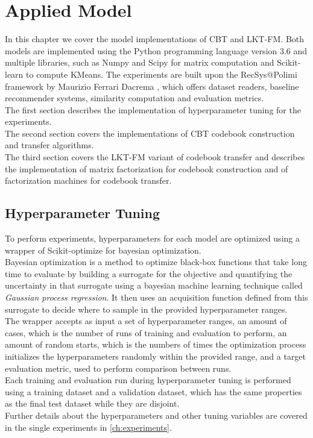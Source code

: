 \chapter{Applied Model}
\label{ch:applied-model}

In this chapter we cover the model implementations of CBT and LKT-FM. Both models are implemented using the Python programming language version 3.6 and multiple libraries, such as Numpy \cite{10.1109/MCSE.2011.37} and Scipy \cite{scipy} for matrix computation and Scikit-learn \cite{10.5555/1953048.2078195} to compute KMeans. The experiments are built upon the RecSys@Polimi framework by Maurizio Ferrari Dacrema \cite{recsys-polimi-framework}, which offers dataset readers, baseline recommender systems, similarity computation and evaluation metrics.\\
The first section describes the implementation of hyperparameter tuning for the experiments.\\
The second section covers the implementations of CBT codebook construction and transfer algorithms.\\
The third section covers the LKT-FM variant of codebook transfer and describes the implementation of matrix factorization for codebook construction and of factorization machines for codebook transfer.



\section{Hyperparameter Tuning}

To perform experiments, hyperparameters for each model are optimized using a wrapper of Scikit-optimize \cite{10.5281/zenodo.1170575} for bayesian optimization.\\
Bayesian optimization \cite{bayesian-optimization} is a method to optimize black-box functions that take long time to evaluate by building a surrogate for the objective and quantifying the uncertainty in that surrogate using a bayesian machine learning technique called \textit{Gaussian process regression}. It then uses an acquisition function defined from this surrogate to decide where to sample in the provided hyperparameter ranges.\\
The wrapper accepts as input a set of hyperparameter ranges, an amount of cases, which is the number of runs of training and evaluation to perform, an amount of random starts, which is the numbers of times the optimization process initializes the hyperparameters randomly within the provided range, and a target evaluation metric, used to perform comparison between runs.\\
Each training and evaluation run during hyperparameter tuning is performed using a training dataset and a validation dataset, which has the same properties as the final test dataset while they are disjoint.\\
Further details about the hyperparameters and other tuning variables are covered in the single experiments in \autoref{ch:experiments}.



